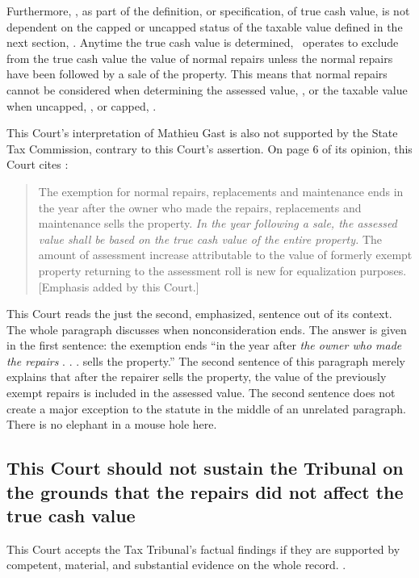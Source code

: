 \documentclass[12pt,\documentclassflag]{michiganCourtOfAppealsBrief}
\begin{document}
Furthermore, \mathieuGast, as part of the definition, or specification, of true cash value, is not dependent on the capped or uncapped status of the taxable value defined in the next section, \cite{MCL 211.27a}. Anytime the true cash value is determined, \mathieuGast\ operates to exclude from the true cash value the value of normal repairs unless the normal repairs have been followed by a sale of the property. This means that normal repairs cannot be considered when determining the assessed value, \cite{MCL 211.27a(1)}, or the taxable value when uncapped, \cite{MCL 211.27a(3)}, or capped, \cite{MCL 211.27a(2)}. 

This Court's interpretation of Mathieu Gast is also not supported by the State Tax Commission, contrary to this Court's assertion. On page 6 of its opinion, this Court cites :

\begin{quote}
The exemption for normal repairs, replacements and maintenance ends in the year after the
owner who made the repairs, replacements and maintenance sells the property. \emph{In the year
following a sale, the assessed value shall be based on the true cash value of the entire property.}
The amount of assessment increase attributable to the value of formerly exempt property
returning to the assessment roll is new for equalization purposes. [Emphasis added by this Court.]
\end{quote}

This Court reads the just the second, emphasized, sentence out of its context. The whole paragraph discusses when nonconsideration ends.
The answer is given in the first sentence: the exemption ends ``in the year after \emph{the owner who made the repairs} . . . sells the property.'' The second sentence of this paragraph merely explains that after the repairer sells the property, the value of the previously exempt repairs is included in the assessed value. The second sentence does not create a major exception to the statute in the middle of an unrelated paragraph. There is no elephant in a mouse hole here.


\subsection{This Court should not sustain the Tribunal on the grounds that the repairs did not affect the true cash value}

This Court accepts the Tax Tribunal's factual findings if they are supported by competent, material, and substantial evidence on the whole record. .
\end{document}
